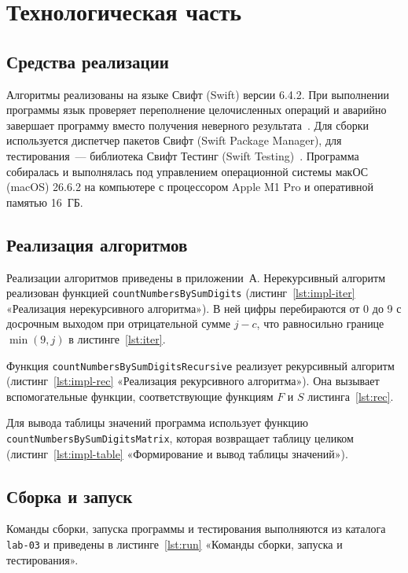 \clearpage
\section{Технологическая часть}

\subsection{Средства реализации}

Алгоритмы реализованы на языке Свифт (Swift) версии 6.4.2. При выполнении
программы язык проверяет переполнение целочисленных операций и аварийно
завершает программу вместо получения неверного результата~\cite{swift}.
Для сборки используется диспетчер пакетов Свифт (Swift Package Manager),
для тестирования~--- библиотека Свифт Тестинг (Swift Testing)~\cite{swifttesting}.
Программа собиралась и выполнялась под управлением операционной системы
макОС (macOS) 26.6.2 на компьютере с процессором Apple M1 Pro и оперативной
памятью 16~ГБ.

\subsection{Реализация алгоритмов}

Реализации алгоритмов приведены в приложении~А. Нерекурсивный алгоритм
реализован функцией \texttt{countNumbersBySumDigits}
(листинг~\ref{lst:impl-iter} «Реализация нерекурсивного алгоритма»).
В ней цифры перебираются от 0 до 9 с досрочным выходом при отрицательной
сумме $j-c$, что равносильно границе $\min(9,j)$ в листинге~\ref{lst:iter}.

Функция \texttt{countNumbersBySumDigitsRecursive} реализует рекурсивный
алгоритм (листинг~\ref{lst:impl-rec} «Реализация рекурсивного алгоритма»).
Она вызывает вспомогательные функции,
соответствующие функциям $F$ и $S$ листинга~\ref{lst:rec}.

Для вывода таблицы значений программа использует функцию
\texttt{countNumbersBySumDigitsMatrix}, которая возвращает таблицу целиком
(листинг~\ref{lst:impl-table} «Формирование и вывод таблицы значений»).

\subsection{Сборка и запуск}

Команды сборки, запуска программы и тестирования выполняются из каталога
\texttt{lab-03} и приведены в листинге~\ref{lst:run} «Команды сборки, запуска
и тестирования».

